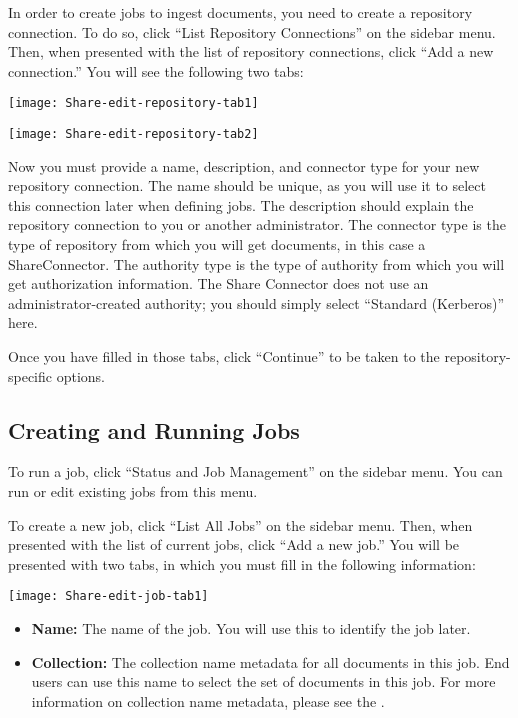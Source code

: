 \begin{changemargin}{1.5in}{0in}
In order to create jobs to ingest documents, you need to create a
repository connection. To do so, click ``List Repository
Connections'' on the sidebar menu. Then, when presented with the list
of repository connections, click ``Add a new connection.'' You will
see the following two tabs:

\texttt{[image: Share-edit-repository-tab1]}

\texttt{[image: Share-edit-repository-tab2]}



Now you must provide a name, description, and connector type for your
new repository connection. The name should be unique, as you will use
it to select this connection later when defining jobs. The description
should explain the repository connection to you or another
administrator.  The connector type is the type of repository from
which you will get documents, in this case a ShareConnector. The
authority type is the type of authority from which you will get
authorization information. The Share Connector does not use an
administrator-created authority; you should simply select ``Standard
(Kerberos)'' here.

Once you have filled in those tabs, click ``Continue'' to be taken to
the repository-specific options.



\subsection{Creating and Running Jobs}

To run a job, click ``Status and Job Management'' on the sidebar menu.
You can run or edit existing jobs from this menu.

To create a new job, click ``List All Jobs'' on the sidebar menu. Then, when
presented with the list of current jobs, click ``Add a new job.'' You
will be presented with two tabs, in which you must fill in the following
information:

\texttt{[image: Share-edit-job-tab1]}

\begin{itemize}

\item \textbf{Name:} The name of the job. You will use this to identify
the job later.

\item \textbf{Collection:} The collection name metadata for all
documents in this job. End users can use this name to select the set
of documents in this job. For more information on collection name
metadata, please see the .


\end{itemize}
\end{changemargin}
